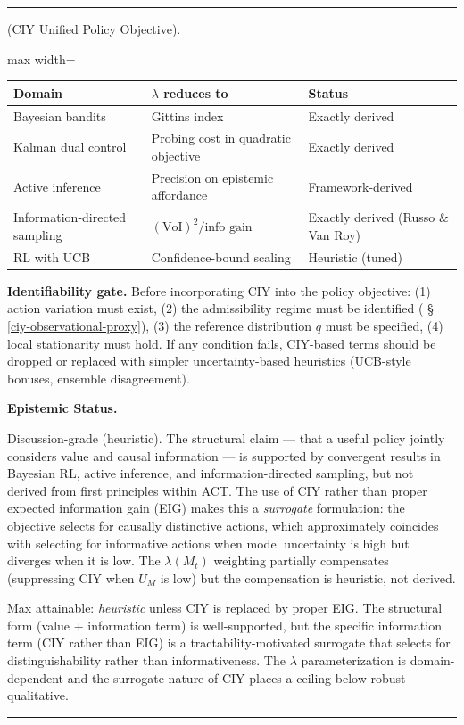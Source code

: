 \documentclass[11pt,oneside]{article}
\newcounter{claim}[section]
\renewcommand{\theclaim}{\thesection.\arabic{claim}}
\newenvironment{segment}[2]{%
  \refstepcounter{claim}%
  \bigskip\noindent\hrule\smallskip
  \noindent{\bfseries #1~\theclaim}\enskip(#2).\par\smallskip
  \noindent\ignorespaces
}{%
  \par\smallskip\noindent\hrule\bigskip
}
\newenvironment{discussion}[1][]{\begin{segment}{Discussion}{#1}}{\end{segment}}
\begin{document}
\begin{discussion}[CIY Unified Policy Objective]
\begin{adjustbox}{max width=\textwidth}
\small
\begin{tabular}{lll}
\toprule
Domain & $\lambda$ reduces to & Status \\
\midrule
Bayesian bandits & Gittins index & Exactly derived \\
Kalman dual control & Probing cost in quadratic objective & Exactly derived \\
Active inference & Precision on epistemic affordance & Framework-derived \\
Information-directed sampling & $(\text{VoI})^2 / \text{info gain}$ & Exactly derived (Russo \& Van Roy) \\
RL with UCB & Confidence-bound scaling & Heuristic (tuned) \\
\bottomrule
\end{tabular}
\end{adjustbox}


\textbf{Identifiability gate.} Before incorporating CIY into the policy objective: (1) action variation must exist, (2) the admissibility regime must be identified ( \S\,\ref{ciy-observational-proxy}), (3) the reference distribution $q$ must be specified, (4) local stationarity must hold. If any condition fails, CIY-based terms should be dropped or replaced with simpler uncertainty-based heuristics (UCB-style bonuses, ensemble disagreement).


\medskip\noindent\textbf{Epistemic Status.}


Discussion-grade (heuristic). The structural claim — that a useful policy jointly considers value and causal information — is supported by convergent results in Bayesian RL, active inference, and information-directed sampling, but not derived from first principles within ACT. The use of CIY rather than proper expected information gain (EIG) makes this a \textit{surrogate} formulation: the objective selects for causally distinctive actions, which approximately coincides with selecting for informative actions when model uncertainty is high but diverges when it is low. The $\lambda(M_t)$ weighting partially compensates (suppressing CIY when $U_M$ is low) but the compensation is heuristic, not derived.

Max attainable: \textit{heuristic} unless CIY is replaced by proper EIG. The structural form (value + information term) is well-supported, but the specific information term (CIY rather than EIG) is a tractability-motivated surrogate that selects for distinguishability rather than informativeness. The $\lambda$ parameterization is domain-dependent and the surrogate nature of CIY places a ceiling below robust-qualitative.



\end{discussion}
\end{document}
